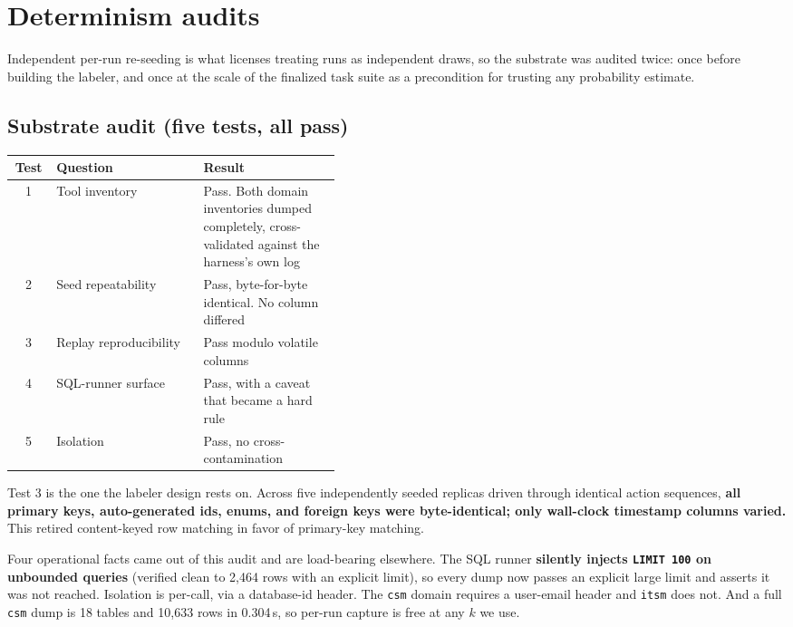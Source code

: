\section{Determinism audits}
\label{app:determinism}

Independent per-run re-seeding is what licenses treating runs as independent
draws, so the substrate was audited twice: once before building the labeler, and
once at the scale of the finalized task suite as a precondition for trusting any
probability estimate.

\subsection{Substrate audit (five tests, all pass)}

\begin{table}[h]
\centering
\small
\begin{tabular}{@{}clp{0.42\linewidth}@{}}
\toprule
Test & Question & Result \\
\midrule
1 & Tool inventory & Pass. Both domain inventories dumped completely,
cross-validated against the harness's own log \\
2 & Seed repeatability & Pass, byte-for-byte identical. No column differed \\
3 & Replay reproducibility & Pass modulo volatile columns \\
4 & SQL-runner surface & Pass, with a caveat that became a hard rule \\
5 & Isolation & Pass, no cross-contamination \\
\bottomrule
\end{tabular}
\end{table}

Test 3 is the one the labeler design rests on. Across five independently seeded
replicas driven through identical action sequences, \textbf{all primary keys,
auto-generated ids, enums, and foreign keys were byte-identical; only wall-clock
timestamp columns varied.} This retired content-keyed row matching in favor of
primary-key matching.

Four operational facts came out of this audit and are load-bearing elsewhere.
The SQL runner \textbf{silently injects \texttt{LIMIT 100} on unbounded
queries} (verified clean to 2{,}464 rows with an explicit limit), so every dump
now passes an explicit large limit and asserts it was not reached. Isolation is
per-call, via a database-id header. The \texttt{csm} domain requires a user-email
header and \texttt{itsm} does not. And a full \texttt{csm} dump is 18 tables and
10{,}633 rows in 0.304\,s, so per-run capture is free at any $k$ we use.

